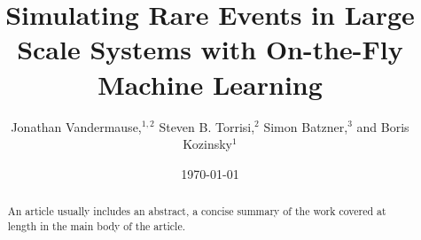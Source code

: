 \documentclass[%
    reprint,
    amsmath,amssymb,
    aps,
   ]{revtex4-1}
\begin{document}
   
   
   \title{Simulating Rare Events in Large Scale Systems with On-the-Fly
   Machine Learning}%
   
   \author{Jonathan Vandermause,$^{1,2}$ Steven B. Torrisi,$^{2}$
           Simon Batzner,$^{3}$ and Boris Kozinsky$^{1}$}

   
   
   
   
   \date{\today}%
   
   \begin{abstract}
   An article usually includes an abstract, a concise summary of the work
   covered at length in the main body of the article. 
   \end{abstract}
   
\end{document}
